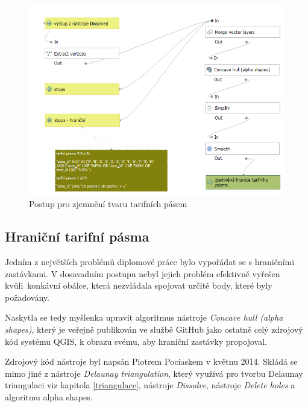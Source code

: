 \begin{figure}[H] \centering
    \includegraphics[width=400pt]{./pictures/postup-smooth.png}
    \caption[Postup pro zjemnění tvaru tarifních pásem pro tarifní pásma]{Postup pro zjemnění tvaru tarifních pásem}
	\label{fig:postup-smooth}              
\end{figure}

\subsection{Hraniční tarifní pásma}
\label{hranice}

Jedním z největších problémů diplomové práce bylo vypořádat se s hraničními zastávkami.
V dosavadním postupu nebyl jejich problém efektivně vyřešen kvůli~kon\-kávní obálce,
která nezvládala spojovat určité body, které byly požadovány.

Naskytla se tedy myšlenka upravit algoritmus nástroje \textit{Concave hull (alpha sha\-pes)},
který je veřejně publikován ve službě GitHub jako ostatně celý zdrojový kód systému QGIS, k obrazu
svému, aby hraniční zastávky propojoval. 

Zdrojový kód nástroje byl napsán Piotrem Pociaskem v květnu 2014. Skládá se mimo jiné z nástroje
\textit{Delaunay triangulation}, který využívá pro tvorbu Delaunay triangulaci viz kapitola \ref{triangulace},
nástroje \textit{Dissolve}, nástroje \textit{Delete holes} a algoritmu alpha shapes.

